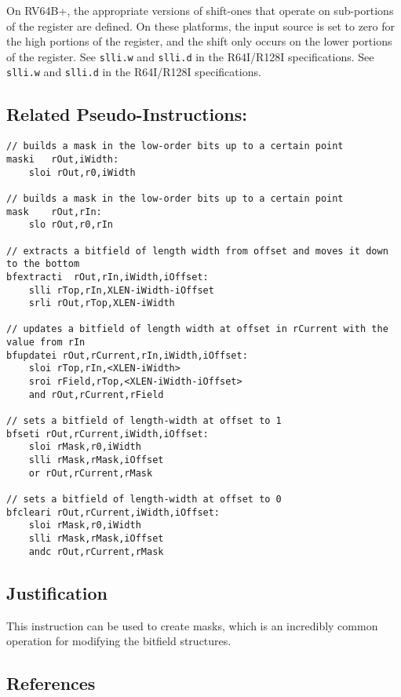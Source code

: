 On RV64B+, the appropriate versions of shift-ones that operate on
sub-portions of the register are defined. On these platforms, the input
source is set to zero for the high portions of the register, and the
shift only occurs on the lower portions of the register. See
\texttt{slli.w} and \texttt{slli.d} in the R64I/R128I specifications.
See \texttt{slli.w} and \texttt{slli.d} in the R64I/R128I
specifications.

\subsection{Related
Pseudo-Instructions:}\label{related-pseudo-instructions-3}

\begin{verbatim}
// builds a mask in the low-order bits up to a certain point
maski   rOut,iWidth:
    sloi rOut,r0,iWidth

// builds a mask in the low-order bits up to a certain point
mask    rOut,rIn:
    slo rOut,r0,rIn

// extracts a bitfield of length width from offset and moves it down to the bottom
bfextracti  rOut,rIn,iWidth,iOffset:
    slli rTop,rIn,XLEN-iWidth-iOffset
    srli rOut,rTop,XLEN-iWidth

// updates a bitfield of length width at offset in rCurrent with the value from rIn
bfupdatei rOut,rCurrent,rIn,iWidth,iOffset:
    sloi rTop,rIn,<XLEN-iWidth>
    sroi rField,rTop,<XLEN-iWidth-iOffset>
    and rOut,rCurrent,rField

// sets a bitfield of length-width at offset to 1
bfseti rOut,rCurrent,iWidth,iOffset:
    sloi rMask,r0,iWidth
    slli rMask,rMask,iOffset
    or rOut,rCurrent,rMask

// sets a bitfield of length-width at offset to 0
bfcleari rOut,rCurrent,iWidth,iOffset:
    sloi rMask,r0,iWidth
    slli rMask,rMask,iOffset
    andc rOut,rCurrent,rMask
\end{verbatim}

\subsection{Justification}\label{justification-2}

This instruction can be used to create masks, which is an incredibly
common operation for modifying the bitfield structures.

\subsection{References}\label{references-3}

